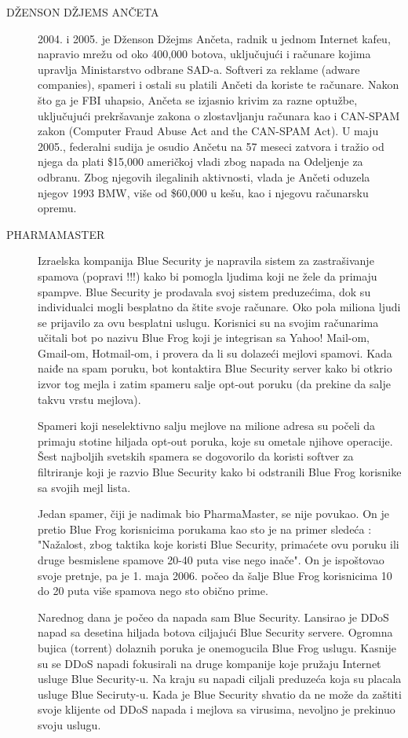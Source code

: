 \documentclass[a4paper]{article}
\begin{document}
\begin{description}
\item[DŽENSON DŽJEMS ANČETA] 2004. i 2005. je Dženson Džejms Ančeta, radnik u jednom Internet kafeu, napravio mrežu od oko 400,000 botova, uključujući i računare kojima upravlja Ministarstvo odbrane SAD-a. Softveri za reklame (adware companies), spameri i ostali su platili Ančeti da koriste te računare. Nakon što ga je FBI uhapsio, Ančeta se izjasnio krivim za razne optužbe, uključujući prekršavanje zakona o zlostavljanju računara kao i CAN-SPAM zakon (Computer Fraud Abuse Act and the CAN-SPAM Act). U maju 2005., federalni sudija je osudio Ančetu na 57 meseci zatvora i tražio od njega da plati \$15,000 američkoj vladi zbog napada na Odeljenje za odbranu. Zbog njegovih ilegalinih aktivnosti, vlada je Ančeti oduzela njegov 1993 BMW, više od \$60,000 u kešu, kao i njegovu računarsku opremu.

\item[PHARMAMASTER] Izraelska kompanija Blue Security je napravila sistem za zastrašivanje spamova (popravi !!!) kako bi pomogla ljudima koji ne žele da primaju spampve. Blue Security je prodavala svoj sistem preduzećima, dok su individualci mogli besplatno da štite svoje računare. Oko pola miliona ljudi se prijavilo za ovu besplatni uslugu. Korisnici su na svojim računarima učitali bot po nazivu Blue Frog koji je integrisan sa Yahoo! Mail-om, Gmail-om, Hotmail-om, i provera da li su dolazeći mejlovi spamovi. Kada naiđe na spam poruku, bot kontaktira Blue Security server kako bi otkrio izvor tog mejla i zatim spameru salje opt-out poruku (da prekine da salje takvu vrstu mejlova).

Spameri koji neselektivno salju mejlove na milione adresa su počeli da primaju stotine hiljada opt-out poruka, koje su ometale njihove operacije. Šest najboljih svetskih spamera se dogovorilo da koristi softver za filtriranje koji je razvio Blue Security kako bi odstranili Blue Frog korisnike sa svojih mejl lista.

Jedan spamer, čiji je nadimak bio PharmaMaster, se nije povukao. On je pretio Blue Frog korisnicima porukama kao sto je na primer sledeća : "Nažalost, zbog taktika koje koristi Blue Security, primaćete ovu poruku ili druge besmislene spamove 20-40 puta vise nego inače". On je ispoštovao svoje pretnje, pa je 1. maja 2006. počeo da šalje Blue Frog korisnicima 10 do 20 puta više spamova nego sto obično prime.

Narednog dana je počeo da napada sam Blue Security. Lansirao je DDoS napad sa desetina hiljada botova ciljajući Blue Security servere. Ogromna bujica (torrent) dolaznih poruka je onemogucila Blue Frog uslugu. Kasnije su se DDoS napadi fokusirali na druge kompanije koje pružaju Internet usluge Blue Security-u. Na kraju su napadi ciljali preduzeća koja su placala usluge Blue Seciruty-u. Kada je Blue Security shvatio da ne može da zaštiti svoje klijente od DDoS napada i mejlova sa virusima, nevoljno je prekinuo svoju uslugu.


\end{description}
\end{document}
